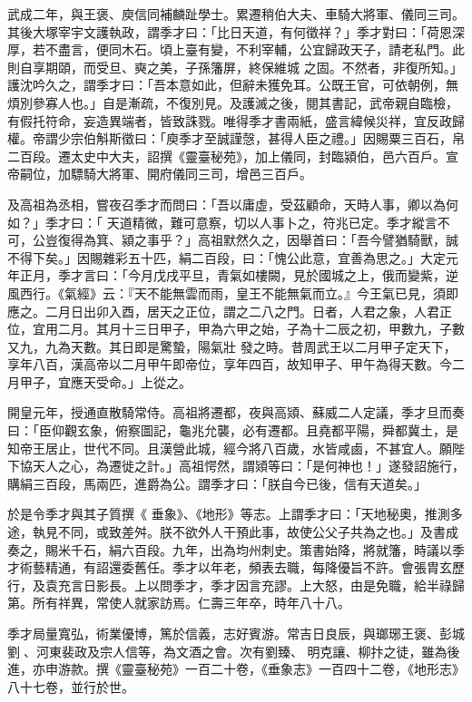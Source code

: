 \begin{pinyinscope}
 武成二年，與王褒、庾信同補麟趾學士。累遷稍伯大夫、車騎大將軍、儀同三司。其後大塚宰宇文護執政，謂季才曰：「比日天道，有何徵祥？」季才對曰：「荷恩深厚，若不盡言，便同木石。頃上臺有變，不利宰輔，公宜歸政天子，請老私門。此則自享期頤，而受旦、奭之美，子孫籓屏，終保維城
 之固。不然者，非復所知。」護沈吟久之，謂季才曰：「吾本意如此，但辭未獲免耳。公既王官，可依朝例，無煩別參寡人也。」自是漸疏，不復別見。及護滅之後，閱其書記，武帝親自臨檢，有假托符命，妄造異端者，皆致誅戮。唯得季才書兩紙，盛言緯候災祥，宜反政歸權。帝謂少宗伯斛斯徵曰：「庾季才至誠謹愨，甚得人臣之禮。」因賜粟三百石，帛二百段。遷太史中大夫，詔撰《靈臺秘苑》，加上儀同，封臨潁伯，邑六百戶。宣帝嗣位，加驃騎大將軍、開府儀同三司，增邑三百戶。



 及高祖為丞相，嘗夜召季才而問曰：「吾以庸虛，受茲顧命，天時人事，卿以為何如？」季才曰：「
 天道精微，難可意察，切以人事卜之，符兆已定。季才縱言不可，公豈復得為箕、潁之事乎？」高祖默然久之，因舉首曰：「吾今譬猶騎獸，誠不得下矣。」因賜雜彩五十匹，絹二百段，曰：「愧公此意，宜善為思之。」大定元年正月，季才言曰：「今月戊戌平旦，青氣如樓闕，見於國城之上，俄而變紫，逆風西行。《氣經》云：『天不能無雲而雨，皇王不能無氣而立。』今王氣已見，須即應之。二月日出卯入酉，居天之正位，謂之二八之門。日者，人君之象，人君正位，宜用二月。其月十三日甲子，甲為六甲之始，子為十二辰之初，甲數九，子數又九，九為天數。其日即是驚蟄，陽氣壯
 發之時。昔周武王以二月甲子定天下，享年八百，漢高帝以二月甲午即帝位，享年四百，故知甲子、甲午為得天數。今二月甲子，宜應天受命。」上從之。



 開皇元年，授通直散騎常侍。高祖將遷都，夜與高熲、蘇威二人定議，季才旦而奏曰：「臣仰觀玄象，俯察圖記，龜兆允襲，必有遷都。且堯都平陽，舜都冀土，是知帝王居止，世代不同。且漢營此城，經今將八百歲，水皆咸鹵，不甚宜人。願陛下協天人之心，為遷徙之計。」高祖愕然，謂熲等曰：「是何神也！」遂發詔施行，購絹三百段，馬兩匹，進爵為公。謂季才曰：「朕自今已後，信有天道矣。」



 於是令季才與其子質撰《
 垂象》、《地形》等志。上謂季才曰：「天地秘奧，推測多途，執見不同，或致差舛。朕不欲外人干預此事，故使公父子共為之也。」及書成奏之，賜米千石，絹六百段。九年，出為均州刺史。策書始降，將就籓，時議以季才術藝精通，有詔還委舊任。季才以年老，頻表去職，每降優旨不許。會張胄玄歷行，及袁充言日影長。上以問季才，季才因言充謬。上大怒，由是免職，給半祿歸第。所有祥異，常使人就家訪焉。仁壽三年卒，時年八十八。



 季才局量寬弘，術業優博，篤於信義，志好賓游。常吉日良辰，與瑯琊王褒、彭城劉、河東裴政及宗人信等，為文酒之會。次有劉臻、
 明克讓、柳抃之徒，雖為後進，亦申游款。撰《靈臺秘苑》一百二十卷，《垂象志》一百四十二卷，《地形志》八十七卷，並行於世。




\end{pinyinscope}
